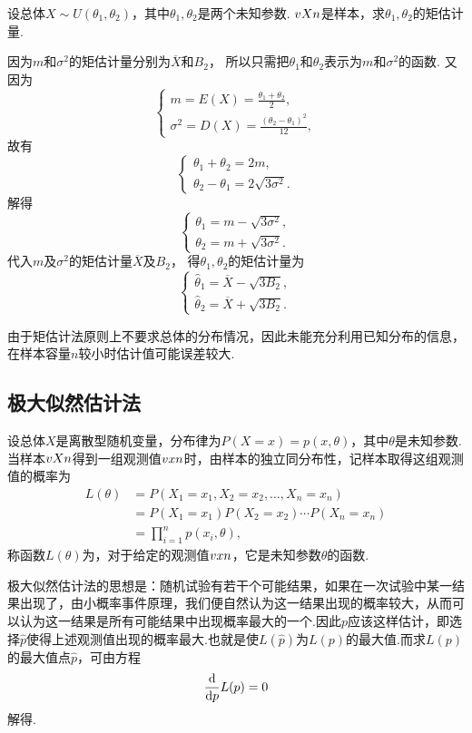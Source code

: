 \begin{example}
设总体\(X \sim U(\theta_1,\theta_2)\)，其中\(\theta_1,\theta_2\)是两个未知参数.
\(v{X}{n}\)是样本，求\(\theta_1,\theta_2\)的矩估计量.
\begin{solution}
因为\(m\)和\(\sigma^2\)的矩估计量分别为\(\overline{X}\)和\(B_2\)，%
所以只需把\(\theta_1\)和\(\theta_2\)表示为\(m\)和\(\sigma^2\)的函数.
又因为\[
\begin{cases}
m = E(X) = \frac{\theta_1+\theta_2}{2}, \\
\sigma^2 = D(X) = \frac{(\theta_2-\theta_1)^2}{12},
\end{cases}
\]故有\[
\begin{cases}
\theta_1+\theta_2 = 2m, \\
\theta_2-\theta_1 = 2 \sqrt{3\sigma^2}.
\end{cases}
\]解得\[
\begin{cases}
\theta_1 = m - \sqrt{3\sigma^2}, \\
\theta_2 = m + \sqrt{3\sigma^2}.
\end{cases}
\]
代入\(m\)及\(\sigma^2\)的矩估计量\(\overline{X}\)及\(B_2\)，%
得\(\theta_1,\theta_2\)的矩估计量为\[
\begin{cases}
\hat{\theta}_1 = \overline{X} - \sqrt{3 B_2}, \\
\hat{\theta}_2 = \overline{X} + \sqrt{3 B_2}.
\end{cases}
\]
\end{solution}
\end{example}

由于矩估计法原则上不要求总体的分布情况，因此未能充分利用已知分布的信息，在样本容量\(n\)较小时估计值可能误差较大.

\subsection{极大似然估计法}
设总体\(X\)是离散型随机变量，分布律为\(P(X=x)=p(x,\theta)\)，其中\(\theta\)是未知参数.当样本\(v{X}{n}\)得到一组观测值\(v{x}{n}\)时，由样本的独立同分布性，记样本取得这组观测值的概率为\begin{align*}
L(\theta)
&=P(X_1=x_1,X_2=x_2,\dotsc,X_n=x_n) \\
&=P(X_1=x_1) P(X_2=x_2) \dotsm P(X_n=x_n) \\
&=\prod_{i=1}^n{p(x_i,\theta)},
\end{align*}称函数\(L(\theta)\)为，对于给定的观测值\(v{x}{n}\)，它是未知参数\(\theta\)的函数.

极大似然估计法的思想是：随机试验有若干个可能结果，如果在一次试验中某一结果出现了，由小概率事件原理，我们便自然认为这一结果出现的概率较大，从而可以认为这一结果是所有可能结果中出现概率最大的一个.因此\(p\)应该这样估计，即选择\(\hat{p}\)使得上述观测值出现的概率最大.也就是使\(L(\hat{p})\)为\(L(p)\)的最大值.而求\(L(p)\)的最大值点\(\hat{p}\)，可由方程\[
\dv{p} L(p) = 0
\]解得.

